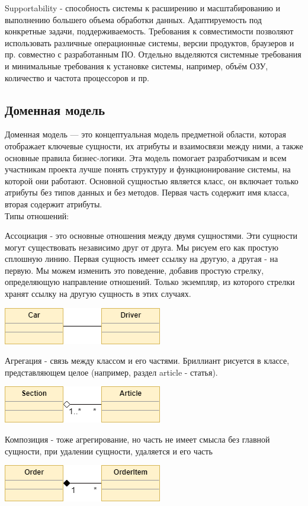Supportability - способность системы к расширению и масштабированию и выполнению большего объема обработки данных. Адаптируемость под конкретные задачи, поддерживаемость.
Требования к совместимости позволяют использовать различные операционные системы, версии продуктов, браузеров и пр. совместно с разработанным ПО. Отдельно выделяются системные требования и минимальные требования к установке системы, например, объём
ОЗУ, количество и частота процессоров и пр.

\subsection[Доменная модель]{Доменная модель}
Доменная модель — это концептуальная модель предметной области, которая отображает ключевые сущности, их атрибуты и взаимосвязи между ними, а также основные правила бизнес-логики. Эта модель помогает разработчикам и всем участникам проекта лучше понять структуру и функционирование системы, на которой они работают.
Основной сущностью является класс, он включает только атрибуты без типов данных и без методов. Первая часть содержит имя класса, вторая содержит атрибуты.
\\ Типы отношений:

Ассоциация - это основные отношения между двумя сущностями. Эти сущности могут существовать независимо друг от друга. Мы рисуем его как простую сплошную линию.
Первая сущность имеет ссылку на другую, а другая - на первую. Мы можем изменить это поведение, добавив простую стрелку, определяющую направление отношений. Только экземпляр, из которого стрелки хранят ссылку на другую сущность в этих случаях.
\\
\begin{center}
    \includegraphics[width=.2\textwidth]{assoch.png}  
\end{center}

Агрегация - связь между классом и его частями. Бриллиант рисуется в классе, представляющем целое (например, раздел article - статья).
\begin{center}
    \includegraphics[width=.2\textwidth]{agreg.png}  
\end{center}

Композиция - тоже агрегирование, но часть не имеет смысла без главной сущности, при удалении сущности, удаляется и его часть
\begin{center}
    \includegraphics[width=.2\textwidth]{sostav.png}  
\end{center}

